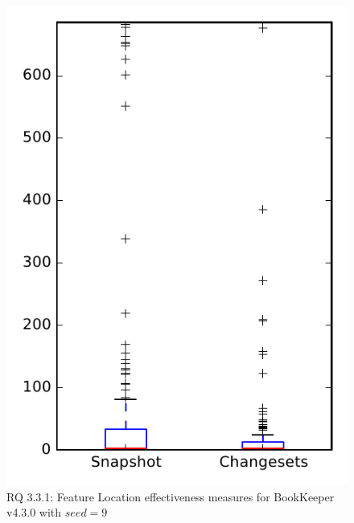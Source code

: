 
\begin{figure}
\centering
\includegraphics[height=0.4\textheight]{figures/flt_seed/rq1_bookkeeper_9}
\caption{RQ 3.3.1: Feature Location effectiveness measures for BookKeeper v4.3.0 with $seed=9$}
\label{fig:flt_seed:rq1:bookkeeper}
\end{figure}

